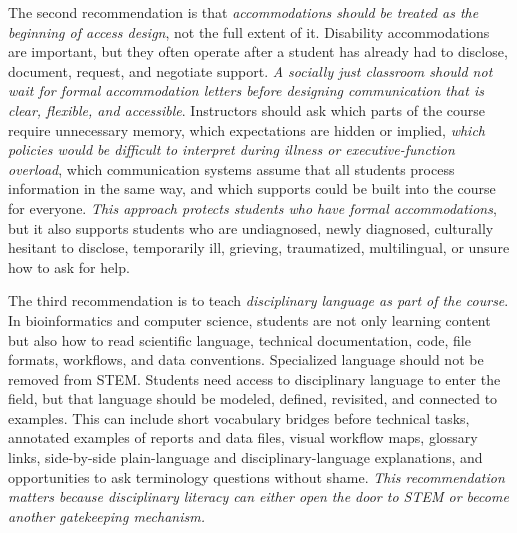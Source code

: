 
The second recommendation is that \textit{accommodations should be treated as the beginning of access design}, not the full extent of it. Disability accommodations are important, but they often operate after a student has already had to disclose, document, request, and negotiate support. \textit{A socially just classroom should not wait for formal accommodation letters before designing communication that is clear, flexible, and accessible}. Instructors should ask which parts of the course require unnecessary memory, which expectations are hidden or implied, \textit{which policies would be difficult to interpret during illness or executive-function overload}, which communication systems assume that all students process information in the same way, and which supports could be built into the course for everyone. \textit{This approach protects students who have formal accommodations}, but it also supports students who are undiagnosed, newly diagnosed, culturally hesitant to disclose, temporarily ill, grieving, traumatized, multilingual, or unsure how to ask for help.


The third recommendation is to teach \textit{disciplinary language as part of the course}. In bioinformatics and computer science, students are not only learning content but also how to read scientific language, technical documentation, code, file formats, workflows, and data conventions. Specialized language should not be removed from STEM. Students need access to disciplinary language to enter the field, but that language should be modeled, defined, revisited, and connected to examples. This can include short vocabulary bridges before technical tasks, annotated examples of reports and data files, visual workflow maps, glossary links, side-by-side plain-language and disciplinary-language explanations, and opportunities to ask terminology questions without shame. \textit{This recommendation matters because disciplinary literacy can either open the door to STEM or become another gatekeeping mechanism.}

